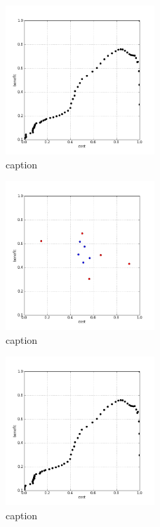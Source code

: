 %
\begin{figure}[!ht]
	\centering
	\includegraphics[width=0.5\textwidth]{img/p1figs/computeFrameStateCubic_simpleCompare_smooth0_tol0_AUC.png}
	\caption{caption}
\end{figure}
%
\begin{figure}[!ht]
	\centering
	\includegraphics[width=0.5\textwidth]{img/p1figs/computeFrameStateCubic_simpleCompare_smooth12_tol0.png}
	\caption{caption}
\end{figure}
%
\begin{figure}[!ht]
	\centering
	\includegraphics[width=0.5\textwidth]{img/p1figs/computeFrameStateCubic_simpleCompare_smooth12_tol0_AUC.png}
	\caption{caption}
\end{figure}
